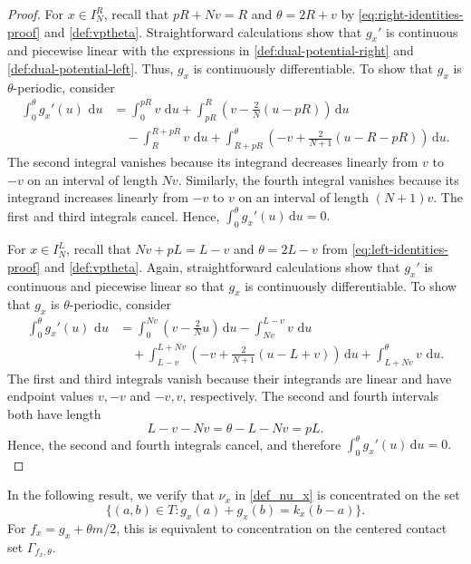 \documentclass{article}
\newcommand{\de}{\mathrm{\,d}}
\begin{document}
\begin{proof}
For \(x\in I_N^R\), recall that \(pR+Nv=R\) and \(\theta=2R+v\) by \eqref{eq:right-identities-proof} and \eqref{def:vptheta}.
Straightforward calculations show that \(g_x'\) is continuous and piecewise linear with the expressions in \eqref{def:dual-potential-right} and \eqref{def:dual-potential-left}.
Thus, \(g_x\) is continuously differentiable.
To show that \(g_x\) is \(\theta\)-periodic, consider
\begin{align*}
    \int_0^\theta g_x'(u)\,\de u
    &=
    \int_0^{pR}v\,\de u
    +
    \int_{pR}^{R}
    \left(
        v-\frac{2}{N}(u-pR)
    \right)\de u\\
    &\quad
    -
    \int_R^{R+pR}v\,\de u
    +
    \int_{R+pR}^{\theta}
    \left(
        -v+\frac{2}{N+1}(u-R-pR)
    \right)\de u.
\end{align*}
The second integral vanishes because its integrand decreases linearly from \(v\) to \(-v\) on an interval of length \(Nv\).
Similarly, the fourth integral vanishes because its integrand increases linearly from \(-v\) to \(v\) on an interval of length \((N+1)v\).
The first and third integrals cancel.
Hence,
\(
    \int_0^\theta g_x'(u)\de u=0.
\)

For \(x\in I_N^L\), recall that \(Nv+pL=L-v\) and \(\theta=2L-v\) from \eqref{eq:left-identities-proof} and \eqref{def:vptheta}.
Again, straightforward calculations show that \(g_x'\) is continuous and piecewise linear so that \(g_x\) is continuously differentiable.
To show that \(g_x\) is \(\theta\)-periodic, consider
\begin{align*}
    \int_0^\theta g_x'(u)\,\de u
    &=
    \int_0^{Nv}
    \left(
        v-\frac{2}{N}u
    \right)\de u
    -
    \int_{Nv}^{L-v}v\,\de u\\
    &\quad+
    \int_{L-v}^{L+Nv}
    \left(
        -v+\frac{2}{N+1}(u-L+v)
    \right)\de u
    +
    \int_{L+Nv}^{\theta}v\,\de u.
\end{align*}
The first and third integrals vanish because their integrands are linear and have endpoint values \(v,-v\) and \(-v,v\), respectively.
The second and fourth intervals both have length
\[
    L-v-Nv
    =
    \theta-L-Nv
    =
    pL.
\]
Hence, the second and fourth integrals cancel, and therefore
\(
    \int_0^\theta g_x'(u)\de u=0.
\)
\end{proof}

In the following result, we verify that \(\nu_x\) in \eqref{def_nu_x} is concentrated on the set \[\{(a,b)\in T:g_x(a)+g_x(b)=k_x(b-a)\}.\] For \(f_x=g_x+\theta m/2\), this is equivalent to concentration on the centered contact set \(\Gamma_{f_x,\theta}\).
\end{document}

